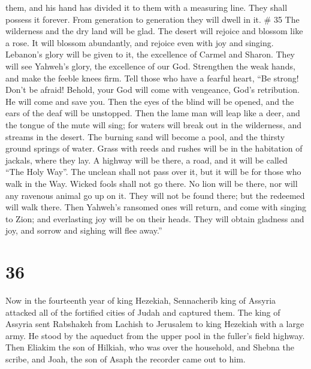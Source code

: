 them, and his hand has divided it to them with a measuring line. They
shall possess it forever. From generation to generation they will dwell
in it. \# 35  The wilderness and the dry land will be glad.
The desert will rejoice and blossom like a rose.  It will
blossom abundantly, and rejoice even with joy and singing. Lebanon's
glory will be given to it, the excellence of Carmel and Sharon. They
will see Yahweh's glory, the excellence of our God. 
Strengthen the weak hands, and make the feeble knees firm. 
Tell those who have a fearful heart, ``Be strong! Don't be afraid!
Behold, your God will come with vengeance, God's retribution. He will
come and save you.  Then the eyes of the blind will be
opened, and the ears of the deaf will be unstopped.  Then
the lame man will leap like a deer, and the tongue of the mute will
sing; for waters will break out in the wilderness, and streams in the
desert.  The burning sand will become a pool, and the
thirsty ground springs of water. Grass with reeds and rushes will be in
the habitation of jackals, where they lay.  A highway will
be there, a road, and it will be called ``The Holy Way''. The unclean
shall not pass over it, but it will be for those who walk in the Way.
Wicked fools shall not go there.  No lion will be there, nor
will any ravenous animal go up on it. They will not be found there; but
the redeemed will walk there.  Then Yahweh's ransomed ones
will return, and come with singing to Zion; and everlasting joy will be
on their heads. They will obtain gladness and joy, and sorrow and
sighing will flee away.''

\hypertarget{section-34}{%
\section{36}\label{section-34}}

 Now in the fourteenth year of king Hezekiah, Sennacherib
king of Assyria attacked all of the fortified cities of Judah and
captured them.  The king of Assyria sent Rabshakeh from
Lachish to Jerusalem to king Hezekiah with a large army. He stood by the
aqueduct from the upper pool in the fuller's field highway. 
Then Eliakim the son of Hilkiah, who was over the household, and Shebna
the scribe, and Joah, the son of Asaph the recorder came out to him.


